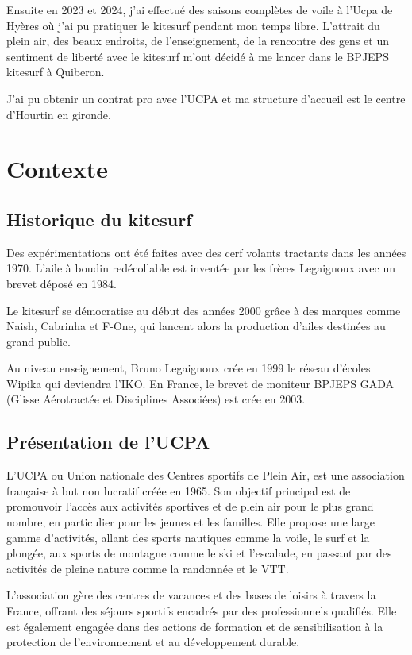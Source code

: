 \documentclass[11pt,a4paper]{report}
\begin{document}
Ensuite en 2023 et 2024, j'ai effectué des saisons complètes de voile
à l'Ucpa\cite{ucpa} de Hyères o\`u j'ai pu pratiquer le kitesurf
pendant mon temps libre. L'attrait du plein air, des beaux endroits,
de l'enseignement, de la rencontre des gens et un sentiment de liberté
avec le kitesurf  m'ont décidé à me lancer dans le BPJEPS kitesurf 
à Quiberon.

J'ai  pu obtenir un contrat pro avec l'UCPA et 
ma structure d'accueil est le centre d'Hourtin en gironde.

\section{Contexte}
\subsection{Historique du kitesurf}

Des expérimentations ont été faites avec des cerf volants tractants 
dans les années 1970. L'aile à boudin redécollable est inventée 
par les frères Legaignoux avec un brevet déposé en 1984\cite{brevet_kite}.

Le kitesurf se démocratise au début des années 2000 grâce à des
marques comme Naish, Cabrinha et F-One, qui lancent alors la 
production d’ailes destinées au grand public.

Au niveau enseignement, Bruno Legaignoux crée en 1999 le
réseau d'écoles Wipika qui deviendra l'IKO\cite{iko}.
En France, le brevet de moniteur BPJEPS GADA (Glisse Aérotractée 
et Disciplines Associées) est crée en 2003.

\subsection{Présentation de l'UCPA}

L'UCPA ou Union nationale des Centres sportifs de Plein Air, est une association
française à but non lucratif  créée en 1965. Son objectif principal est
de promouvoir l'accès aux activités sportives et de plein air pour le plus grand
nombre, en particulier pour les jeunes et les familles. Elle propose une large
gamme d'activités, allant des sports nautiques comme la voile, le surf et la plongée,
aux sports de montagne comme le ski et l'escalade, en passant par des activités de
pleine nature comme la randonnée et le VTT.

L'association gère des centres de vacances et des bases de loisirs à travers la
France, offrant des séjours sportifs encadrés par des professionnels qualifiés.
Elle est également engagée dans des actions de formation et de sensibilisation 
à la protection de l'environnement et au développement durable.
\end{document}
